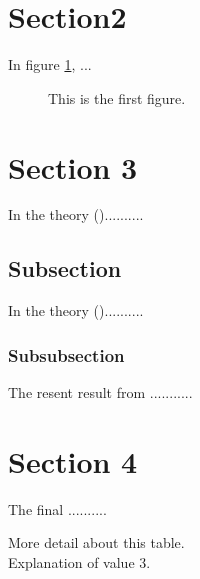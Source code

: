 \documentclass[]{pasj01}
\begin{document}
\newpage

\section{Section2}

In figure \ref{fig:sample}, ...

\begin{figure}
 \begin{center}
 \end{center}
\caption{This is the first figure.}\label{fig:sample}
\end{figure}


\section{Section 3}

In the theory (\cite{key-1})..........

\subsection{Subsection}

In the theory (\cite{key-2})..........

\subsubsection{Subsubsection}

The resent result from ...........


\newpage

\section{Section 4}

The final ..........



\begin{table}
  \label{tab:first}
\begin{tabnote}
\footnotemark[$*$] More detail about this table.  \\ 
\footnotemark[$\dag$] Explanation of value 3. 
\end{tabnote}
\end{table}
\end{document}
